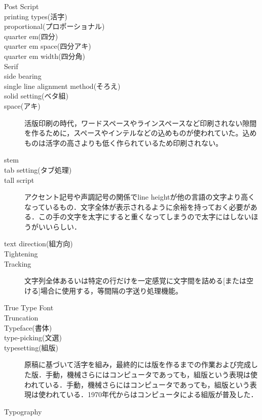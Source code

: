 \begin{description}
    \item[Post Script]
    \item[printing types(活字)]
    \item[proportional(プロポーショナル)]
    \item[quarter em(四分)]
    \item[quarter em space(四分アキ)]
    \item[quarter em width(四分角)]
    \item[Serif]
    \item[side bearing]
    \item[single line alignment method(そろえ)]
    \item[solid setting(ベタ組)]
    \item[space(アキ)]活版印刷の時代，ワードスペースやラインスペースなど印刷されない隙間を作るために，スペースやインテルなどの込めものが使われていた。込めものは活字の高さよりも低く作られているため印刷されない\cite{handbook_of_typography}。
    \item[stem]
    \item[tab setting(タブ処理)]
    \item[tall script]アクセント記号や声調記号の関係でline heightが他の言語の文字より高くなっているもの．文字全体が表示されるように余裕を持っておく必要がある\cite{developer.apple.com:videos/play/wwdc2016/201/}．この手の文字を太字にすると重くなってしまうので太字にはしないほうがいいらしい\cite{material.io:design/typography/language-support.html}．
    \item[text direction(組方向)]
    \item[Tightening]
    \item[Tracking]文字列全体あるいは特定の行だけを一定感覚に文字間を詰める[または空ける]場合に使用する，等間隔の字送り処理機能\cite{handbook_of_typography}。
    \item[True Type Font]
    \item[Truncation]
    \item[Typeface(書体)]
    \item[type-picking(文選)]
    \item[typesetting(組版)] 原稿に基づいて活字を組み，最終的には版を作るまでの作業および完成した版．手動，機械さらにはコンピュータであっても，組版という表現は使われている．手動，機械さらにはコンピュータであっても，組版という表現は使われている\cite{lis_dictionary}．1970年代からはコンピュータによる組版が普及した\cite{www.printing-museum.org:communication/column/pdf/column_6.pdf}．
    \item[Typography]

\end{description}
